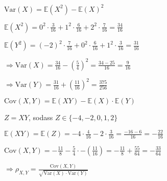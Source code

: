 \documentclass[a4paper,12pt]{article}
\begin{document}
    \bigskip

    $ \text{Var}(X) = \mathbb{E}(X^2) - \mathbb{E}(X)^2 $

    \bigskip

    $ \displaystyle \mathbb{E}(X^2) = 0^2 \cdot \frac{3}{16} + 1^2 \cdot \frac{6}{16} + 2^2 \cdot \frac{7}{16} = \frac{34}{16} $

    \medskip

    $ \displaystyle \mathbb{E}(Y^2) = (-2)^2 \cdot \frac{7}{16} + 0^2 \cdot \frac{6}{16} + 1^2 \cdot \frac{3}{16} = \frac{31}{16} $

    \bigskip

    $ \displaystyle \Rightarrow \text{Var}(X) = \frac{34}{16} - (\frac{5}{4})^2 = \frac{34 - 25}{16} = \frac{9}{16} $

    \medskip

    $ \displaystyle \Rightarrow \text{Var}(Y) = \frac{31}{16} + (\frac{11}{16})^2 = \frac{375}{256} $

    \newpage

    $ \text{Cov}(X, Y) = \mathbb{E}(XY) - \mathbb{E}(X) \cdot \mathbb{E}(Y) $ 

    \medskip

    $ Z = XY $, sodass $ Z \in \{-4, -2, 0, 1, 2\} $  

    $ \displaystyle \mathbb{E}(XY) = \mathbb{E}(Z) = -4 \cdot \frac{4}{16} -2 \cdot \frac{3}{16} = \frac{-16 - 6}{16} = - \frac{22}{16} $

    \medskip

    $ \displaystyle \text{Cov}(X, Y) = -\frac{11}{8} - \frac{5}{4} \cdot -(\frac{11}{16}) = -\frac{11}{8} + \frac{55}{64} = - \frac{33}{64} $

    \bigskip

    $ \displaystyle \Rightarrow \rho_{X, Y} = \frac{\text{Cov}(X, Y)}{\sqrt{\text{Var}(X) \cdot \text{Var}(Y)}} $
\end{document}
